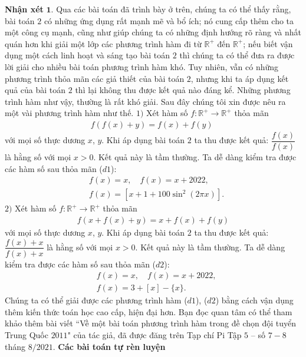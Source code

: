 \begin{multicols}{2}
	\vskip 0.1cm
	\textbf{\color{hoccungpi}Nhận xét} $\pmb{1.}$
		Qua các bài toán đã trình bày ở trên, chúng ta có thể thấy rằng, 
		bài toán $2$ có những ứng dụng rất mạnh mẽ và bổ ích; nó cung cấp thêm cho ta một công cụ mạnh, cũng như giúp chúng ta có những định hướng rõ ràng và nhất quán hơn khi giải một lớp các phương trình hàm đi từ $\mathbb R^+$ đến
		$\mathbb R^+$; nếu biết vận dụng một cách linh hoạt và sáng tạo    
		bài toán $2$ thì chúng ta có thể đưa ra được lời giải cho nhiều bài toán phương trình hàm khó. Tuy nhiên, vẫn có những phương trình thỏa mãn các giả thiết của bài toán $2$, nhưng khi ta áp dụng kết quả của bài toán $2$ thì lại không thu được kết quả nào đáng kể. Những phương trình hàm như vậy, thường là rất khó giải. Sau đây chúng tôi xin được nêu ra một vài phương trình hàm như thế.
		\vskip 0.1cm
		$1)$ Xét hàm số $f: \mathbb R^+ \to \mathbb R^+$ thỏa mãn 
			\begin{align*}
				f(f(x)+y) = f(x)+f(y)\,\, \tag{$d1$}
			\end{align*}
			với mọi số thực dương $x$, $y$.
			Khi áp dụng 
			bài toán $2$ ta thu được kết quả: $\dfrac{{f(x)}}{{f(x)}}$ là hằng số với mọi $x>0$. Kết quả này  là tầm thường. Ta dễ dàng kiểm tra được các hàm số sau thỏa mãn ($d1$):
			\begin{align*}
				&f(x) = x,\quad f(x) =x+2022,\\
				&f(x) = \left[ {x + 1 + 100{{\sin }^2}(2\pi x)} \right].
			\end{align*}
			$2)$  Xét hàm số $f: \mathbb R^+ \to \mathbb R^+$ thỏa mãn 
			\begin{align*}
				f(x+f(x)+y)=x+f(x)+f(y)\tag{$d2$}
			\end{align*}
			với mọi số thực dương $x$, $y$.
			Khi áp dụng 
			bài toán $2$ ta thu được kết quả: $\dfrac{{f(x)+x}}{{f(x)+x}}$ là hằng số với mọi $x>0$. Kết quả này  là tầm thường. 
			Ta dễ dàng kiểm tra được các hàm số sau thỏa mãn ($d2$):
			\begin{align*}
				&f(x) = x,\quad 
				f(x) =x+2022,\\
				&f(x) = 3 + \left[ x \right] - \{ x\}.
			\end{align*}
		Chúng ta có thể giải được các phương trình hàm ($d1$), ($d2$) bằng cách vận dụng thêm 
		kiến thức toán học cao cấp, hiện đại  hơn. Bạn đọc quan tâm có thể tham khảo thêm bài viết ``Về một bài toán phương trình hàm trong đề chọn đội tuyển Trung Quốc $2011$" của tác giả, đã được đăng trên 
		Tạp chí Pi Tập $5$ -- số $7-8$ tháng $8/2021$.
	\vskip 0.1cm
	\textbf{\color{hoccungpi}Các bài toán tự rèn luyện}

\end{multicols}

